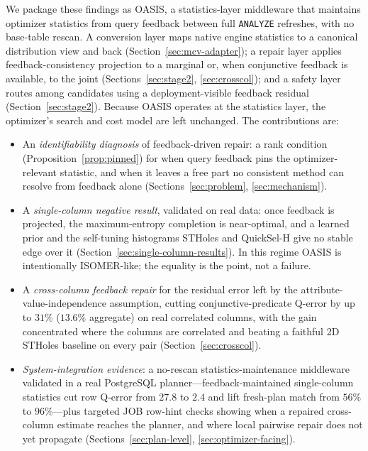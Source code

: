 \documentclass[preprint,12pt]{elsarticle}
\begin{document}
We package these findings as OASIS, a statistics-layer middleware that maintains optimizer
statistics from query feedback between full \texttt{ANALYZE} refreshes, with no base-table
rescan. A conversion layer maps native engine statistics to a canonical distribution view
and back (Section~\ref{sec:mcv-adapter}); a repair layer applies feedback-consistency
projection to a marginal or, when conjunctive feedback is available, to the joint
(Sections~\ref{sec:stage2}, \ref{sec:crosscol}); and a safety layer routes among candidates
using a deployment-visible feedback residual (Section~\ref{sec:stage2}). Because OASIS
operates at the statistics layer, the optimizer's search and cost model are left unchanged.
The contributions are:
\begin{itemize}
  \item An \emph{identifiability diagnosis} of feedback-driven repair: a rank condition
        (Proposition~\ref{prop:pinned}) for when query feedback pins the optimizer-relevant
        statistic, and when it leaves a free part no consistent method can resolve from
        feedback alone (Sections~\ref{sec:problem}, \ref{sec:mechanism}).
  \item A \emph{single-column negative result}, validated on real data: once feedback is
        projected, the maximum-entropy completion is near-optimal, and a learned prior and
        the self-tuning histograms STHoles and QuickSel-H give no stable edge over it
        (Section~\ref{sec:single-column-results}). In this regime OASIS is intentionally
        ISOMER-like; the equality is the point, not a failure.
  \item A \emph{cross-column feedback repair} for the residual error left by the
        attribute-value-independence assumption, cutting conjunctive-predicate Q-error by up
        to $31\%$ ($13.6\%$ aggregate) on real correlated columns, with the gain concentrated
        where the columns are correlated and beating a faithful 2D STHoles baseline on every
        pair (Section~\ref{sec:crosscol}).
  \item \emph{System-integration evidence}: a no-rescan statistics-maintenance middleware
        validated in a real PostgreSQL planner---feedback-maintained single-column statistics cut row Q-error
        from $27.8$ to $2.4$ and lift fresh-plan match from $56\%$ to $96\%$---plus targeted
        JOB row-hint checks showing when a repaired cross-column estimate reaches the planner,
        and where local pairwise repair does not yet propagate
        (Sections~\ref{sec:plan-level}, \ref{sec:optimizer-facing}).
\end{itemize}
\end{document}
